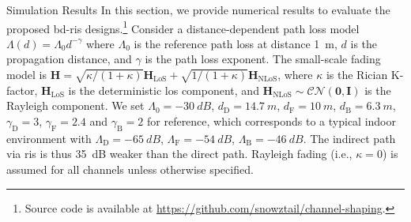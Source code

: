 \begin{section}{Simulation Results}\label{sc:simulation}
 In this section, we provide numerical results to evaluate the proposed \gls{bd}-\gls{ris} designs.\footnote{Source code is available at \url{https://github.com/snowztail/channel-shaping}.}
 Consider a distance-dependent path loss model $\Lambda(d) = \Lambda_0 d^{-\gamma}$ where $\Lambda_0$ is the reference path loss at distance \qty{1}{m}, $d$ is the propagation distance, and $\gamma$ is the path loss exponent.
 The small-scale fading model is $\mathbf{H} = \sqrt{\kappa/(1+\kappa)} \mathbf{H}_\text{LoS} + \sqrt{1/(1+\kappa)} \mathbf{H}_\text{NLoS}$, where $\kappa$ is the Rician K-factor, $\mathbf{H}_\text{LoS}$ is the deterministic \gls{los} component, and $\mathbf{H}_\text{NLoS} \sim \mathcal{CN}(\mathbf{0}, \mathbf{I})$ is the Rayleigh component.
 We set $\Lambda_0=\qty{-30}{dB}$, $d_\mathrm{D}=\qty{14.7}{m}$, $d_\mathrm{F}=\qty{10}{m}$, $d_\mathrm{B}=\qty{6.3}{m}$, $\gamma_\mathrm{D}=3$, $\gamma_\mathrm{F}=2.4$ and $\gamma_\mathrm{B}=2$ for reference, which corresponds to a typical indoor environment with $\Lambda_\mathrm{D}=\qty{-65}{dB}$, $\Lambda_\mathrm{F}=\qty{-54}{dB}$, $\Lambda_\mathrm{B}=\qty{-46}{dB}$.
 The indirect path via \gls{ris} is thus \qty{35}{\dB} weaker than the direct path.
 Rayleigh fading (i.e., $\kappa = 0$) is assumed for all channels unless otherwise specified.


\end{section}
